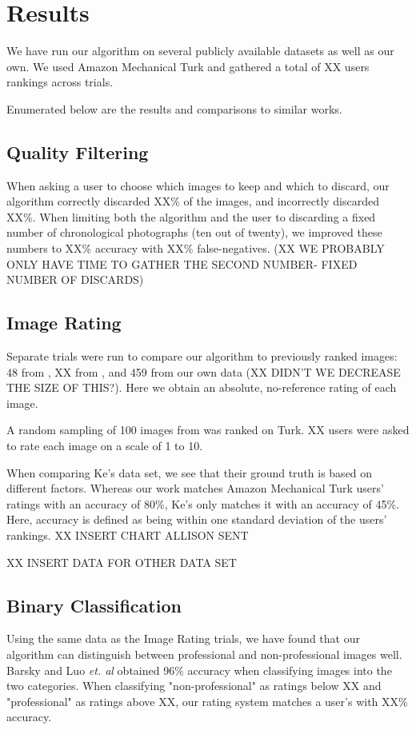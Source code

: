 \documentclass[twocolumn]{article}
\begin{document}
\section{Results}
We have run our algorithm on several publicly available datasets as well as our own. We used Amazon Mechanical Turk and gathered a total of XX users rankings across trials.

Enumerated below are the results and comparisons to similar works.

\subsection{Quality Filtering} When asking a user to choose which images to keep and which to discard, our algorithm correctly discarded XX\% of the images, and incorrectly discarded XX\%. When limiting both the algorithm and the user to discarding a fixed number of chronological photographs (ten out of twenty), we improved these numbers to XX\% accuracy with XX\% false-negatives. (XX WE PROBABLY ONLY HAVE TIME TO GATHER THE SECOND NUMBER- FIXED NUMBER OF DISCARDS)

\subsection{Image Rating} Separate trials were run to compare our algorithm to previously ranked images: 48 from \cite{1640788}, XX from \cite{springerlink:10.1007/978-3-540-88690-7_29}, and 459 from our own data (XX DIDN'T WE DECREASE THE SIZE OF THIS?). Here we obtain an absolute, no-reference rating of each image.

A random sampling of 100 images from \cite{springerlink:10.1007/978-3-540-88690-7_29} was ranked on Turk. XX users were asked to rate each image on a scale of 1 to 10.

When comparing Ke's data set, we see that their ground truth is based on different factors. Whereas our work matches Amazon Mechanical Turk users' ratings with an accuracy of 80\%, Ke's only matches it with an accuracy of 45\%. Here, accuracy is defined as being within one standard deviation of the users' rankings.
XX INSERT CHART ALLISON SENT

XX INSERT DATA FOR OTHER DATA SET

\subsection{Binary Classification} Using the same data as the Image Rating trials, we have found that our algorithm can distinguish between professional and non-professional images well. Barsky \cite{Yeh:2010:PPR:1873951.1873963} and Luo \emph{et. al}\cite{springerlink:10.1007/978-3-540-88690-7_29} obtained 96\% accuracy when classifying images into the two categories. When classifying "non-professional" as ratings below XX and "professional" as ratings above XX, our rating system matches a user's with XX\% accuracy.
\end{document}

